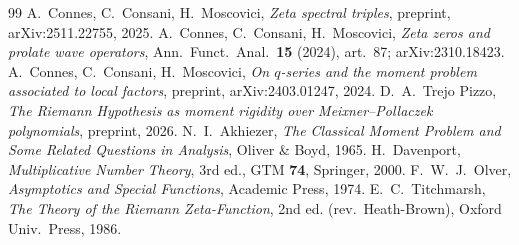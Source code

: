 \documentclass[11pt]{amsart}
\theoremstyle{definition}
\theoremstyle{remark}
\begin{document}
\begin{thebibliography}{99}
 A.~Connes, C.~Consani, H.~Moscovici, \emph{Zeta spectral triples}, preprint,
arXiv:2511.22755, 2025.
 A.~Connes, C.~Consani, H.~Moscovici, \emph{Zeta zeros and prolate wave
operators}, Ann.\ Funct.\ Anal.\ \textbf{15} (2024), art.~87; arXiv:2310.18423.
 A.~Connes, C.~Consani, H.~Moscovici, \emph{On $q$-series and the moment problem
associated to local factors}, preprint, arXiv:2403.01247, 2024.
 D.~A.~Trejo Pizzo, \emph{The Riemann Hypothesis as moment rigidity over
Meixner--Pollaczek polynomials}, preprint, 2026.
 N.~I.~Akhiezer, \emph{The Classical Moment Problem and Some Related Questions
in Analysis}, Oliver \& Boyd, 1965.
 H.~Davenport, \emph{Multiplicative Number Theory}, 3rd ed., GTM \textbf{74},
Springer, 2000.
 F.~W.~J.~Olver, \emph{Asymptotics and Special Functions}, Academic Press, 1974.
 E.~C.~Titchmarsh, \emph{The Theory of the Riemann Zeta-Function}, 2nd ed.
(rev.\ Heath-Brown), Oxford Univ.\ Press, 1986.
\end{thebibliography}
\end{document}
